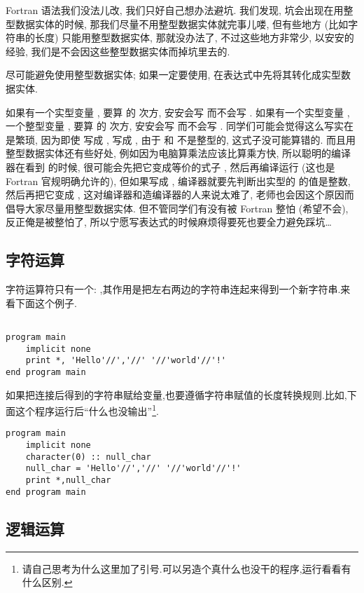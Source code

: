Fortran 语法我们没法儿改, 我们只好自己想办法避坑. 我们发现, 坑会出现在用整型数据实体的时候, 那我们尽量不用整型数据实体就完事儿喽, 但有些地方 (比如字符串的长度) 只能用整型数据实体, 那就没办法了, 不过这些地方非常少, 以安安的经验, 我们是不会因这些整型数据实体而掉坑里去的.
\begin{convention}
    尽可能避免使用整型数据实体; 如果一定要使用, 在表达式中先将其转化成实型数据实体.
\end{convention}
如果有一个实型变量 , 要算  的  次方, 安安会写  而不会写 . 如果有一个实型变量 , 一个整型变量 , 要算  的  次方, 安安会写  而不会写 . 同学们可能会觉得这么写实在是繁琐, 因为即使  写成 ,  写成 , 由于  和  不是整型的, 这式子没可能算错的. 而且用整型数据实体还有些好处, 例如因为电脑算乘法应该比算乘方快, 所以聪明的编译器在看到  的时候, 很可能会先把它变成等价的式子 , 然后再编译运行 (这也是 Fortran 官规明确允许的), 但如果写成 , 编译器就要先判断出实型的  的值是整数, 然后再把它变成 , 这对编译器和造编译器的人来说太难了, 老师也会因这个原因而倡导大家尽量用整型数据实体. 但不管同学们有没有被 Fortran 整怕 (希望不会), 反正俺是被整怕了, 所以宁愿写表达式的时候麻烦得要死也要全力避免踩坑\dots{}

\subsection{字符运算}\label{fortran_char_operator}

字符运算符只有一个: \ttt{//},其作用是把左右两边的字符串连起来得到一个新字符串.来看下面这个例子.
\begin{lstlisting}

program main
    implicit none
    print *, 'Hello'//','//' '//'world'//'!'
end program main
\end{lstlisting}

如果把连接后得到的字符串赋给变量,也要遵循字符串赋值的长度转换规则.比如,下面这个程序运行后``什么也没输出''\footnote{
    请自己思考为什么这里加了引号.可以另造个真什么也没干的程序,运行看看有什么区别.
}.
\begin{lstlisting}
program main
    implicit none
    character(0) :: null_char
    null_char = 'Hello'//','//' '//'world'//'!'
    print *,null_char
end program main
\end{lstlisting}

\subsection{逻辑运算}

